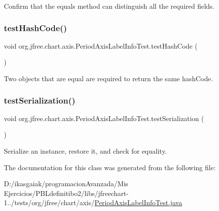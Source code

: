 Confirm that the equals method can distinguish all the required fields. \mbox{\label{classorg_1_1jfree_1_1chart_1_1axis_1_1_period_axis_label_info_test_ac973e8424289d7d4eea77a09f0b922b4}} 
\subsubsection{\texorpdfstring{test\+Hash\+Code()}{testHashCode()}}
{\footnotesize\ttfamily void org.\+jfree.\+chart.\+axis.\+Period\+Axis\+Label\+Info\+Test.\+test\+Hash\+Code (\begin{DoxyParamCaption}{ }\end{DoxyParamCaption})}

Two objects that are equal are required to return the same hash\+Code. \mbox{\label{classorg_1_1jfree_1_1chart_1_1axis_1_1_period_axis_label_info_test_ad37069fcb81888fba9668a23489230d1}} 
\subsubsection{\texorpdfstring{test\+Serialization()}{testSerialization()}}
{\footnotesize\ttfamily void org.\+jfree.\+chart.\+axis.\+Period\+Axis\+Label\+Info\+Test.\+test\+Serialization (\begin{DoxyParamCaption}{ }\end{DoxyParamCaption})}

Serialize an instance, restore it, and check for equality. 

The documentation for this class was generated from the following file\+:\begin{DoxyCompactItemize}
\item 
D\+:/ikasgaiak/programacion\+Avanzada/\+Mis Ejercicios/\+P\+B\+Ldefinitibo2/libs/jfreechart-\/1../tests/org/jfree/chart/axis/\mbox{\hyperlink{_period_axis_label_info_test_8java}{Period\+Axis\+Label\+Info\+Test.\+java}}\end{DoxyCompactItemize}
